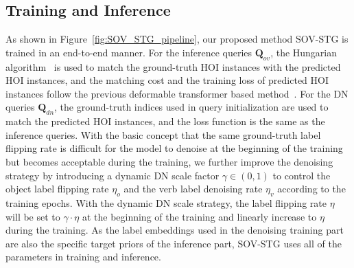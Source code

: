 \documentclass[10pt,twocolumn,letterpaper]{article}
\begin{document}
\subsection{Training and Inference}
\label{sec:training_inference}
As shown in Figure~\ref{fig:SOV_STG_pipeline}, our proposed method SOV-STG is trained in an end-to-end manner.
For the inference queries $\bm{Q}_{ov}$, the Hungarian algorithm~\cite{kuhn1955hungarian} is used to match the ground-truth HOI instances with the predicted HOI instances, and the matching cost and the training loss of predicted HOI instances follow the previous deformable transformer based method~\cite{cjw_qahoi}.
For the DN queries $\bm{Q}_{dn}$, the ground-truth indices used in query initialization are used to match the predicted HOI instances, and the loss function is the same as the inference queries.
With the basic concept that the same ground-truth label flipping rate is difficult for the model to denoise at the beginning of the training but becomes acceptable during the training, we further improve the denoising strategy by introducing a dynamic DN scale factor $\gamma\in (0,1)$ to control the object label flipping rate $\eta_o$ and the verb label denoising rate $\eta_v$ according to the training epochs.
With the dynamic DN scale strategy, the label flipping rate $\eta$ will be set to $\gamma \cdot \eta$ at the beginning of the training and linearly increase to $\eta$ during the training.
As the label embeddings used in the denoising training part are also the specific target priors of the inference part, SOV-STG uses all of the parameters in training and inference.
\end{document}
